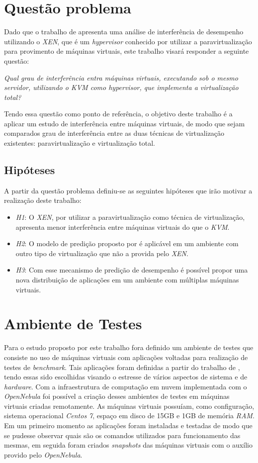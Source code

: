 \section{Questão problema}
Dado que o trabalho de  apresenta uma análise de interferência de desempenho utilizando o \textit{XEN}, que é um \textit{hypervisor} conhecido por utilizar a paravirtualização para provimento de máquinas virtuais, este trabalho visará responder a seguinte questão:

\textit{ Qual  grau de interferência entra máquinas virtuais, executando sob o mesmo servidor, utilizando o \textit{KVM} como \textit{hypervisor}, que implementa a virtualização total?  }
 
Tendo essa questão como ponto de referência, o objetivo deste trabalho é a aplicar um estudo de interferência entre máquinas virtuais, de modo que sejam comparados grau de interferência entre as duas técnicas de virtualização existentes: paravirtualização e virtualização total.
\subsection{Hipóteses}
A partir da questão problema definiu-se as seguintes hipóteses que irão motivar a realização deste trabalho:

\begin{itemize}
	\item \textit{H1}: O \textit{XEN}, por utilizar a paravirtualização como técnica de virtualização, apresenta menor interferência entre máquinas virtuais do que o \textit{KVM}.
	\item \textit{H2}: O modelo de predição proposto por  é aplicável em um ambiente com outro tipo de virtualização que não a provida pelo \textit{XEN}. %
	\item \textit{H3}: Com esse mecanismo de predição de desempenho é possível propor uma nova distribuição de aplicações em um ambiente com múltiplas máquinas virtuais.  %
\end{itemize}
	
\section{Ambiente de Testes}\label{sec:ambiente_teste}
Para o estudo proposto por este trabalho fora definido um  ambiente de testes que consiste no uso de máquinas virtuais com aplicações voltadas para realização
de testes de \textit{benchmark}. Tais aplicações foram definidas a partir do trabalho de , tendo essas sido escolhidas visando o estresse de vários aspectos de sistema e de \textit{hardware}. Com a infraestrutura de computação em nuvem implementada com o \textit{OpenNebula} foi possível a criação desses ambientes de testes em máquinas virtuais criadas remotamente. As máquinas virtuais possuíam, como configuração, sistema operacional \textit{Centos 7}, espaço em disco de 15GB e 1GB de memória \textit{RAM}. Em um primeiro momento as aplicações foram instaladas e testadas de modo que se pudesse observar quais são os comandos utilizados para funcionamento das mesmas, em seguida foram criados \textit{snapshots} das máquinas virtuais com o auxílio provido pelo \textit{OpenNebula}. 


